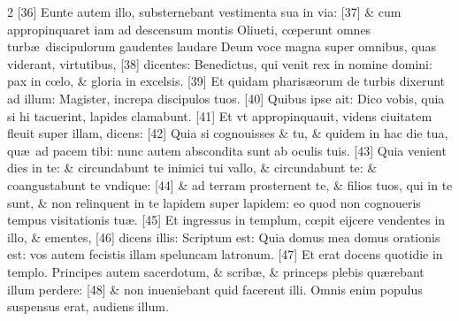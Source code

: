 \documentclass[a5paper,10pt]{book}
\def\ae{æ}
\def\oe{œ}
\begin{document}
\begin{multicols*}{2}
[36] Eunte autem illo, substernebant vestimenta sua in via: [37] \& cum appropinquaret iam ad descensum montis Oliueti, c\oe perunt omnes turb\ae \ discipulorum gaudentes laudare Deum voce magna super omnibus, quas viderant, virtutibus, [38] dicentes: Benedictus, qui venit rex in nomine domini: pax in c\oe lo, \& gloria in excelsis. [39] Et quidam pharis\ae orum de turbis dixerunt ad illum: Magister, increpa discipulos tuos. [40] Quibus ipse ait: Dico vobis, quia si hi tacuerint, lapides clamabunt.
[41] Et vt appropinquauit, videns ciuitatem fleuit super illam, dicens: [42] Quia si cognouisses \& tu, \& quidem in hac die tua, qu\ae \ ad pacem tibi: nunc autem abscondita sunt ab oculis tuis. [43] Quia venient dies in te: \& circundabunt te inimici tui vallo, \& circundabunt te: \& coangustabunt te vndique: [44] \& ad terram prosternent te, \& filios tuos, qui in te sunt, \& non relinquent in te lapidem super lapidem: eo quod non cognoueris tempus visitationis tu\ae . [45] Et ingressus in templum, c\oe pit eijcere vendentes in illo, \& ementes,
[46] dicens illis: Scriptum est: Quia domus mea domus orationis est: vos autem fecistis illam speluncam latronum. [47] Et erat docens quotidie in templo. Principes autem sacerdotum, \& scrib\ae , \& princeps plebis qu\ae rebant illum perdere: [48] \& non inueniebant quid facerent illi. Omnis enim populus suspensus erat, audiens illum.

\end{multicols*}
\end{document}
